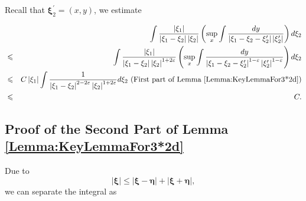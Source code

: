 \documentclass[reqno]{amsart}
\theoremstyle{plain}
\numberwithin{equation}{section}
\begin{document}
Recall that $\mathbf{\xi }_{2}^{\prime }=(x,y)$, we estimate

\begin{eqnarray*}
&&\int \frac{\left\vert \mathbf{\xi }_{1}\right\vert }{\left\vert \mathbf{\xi }_{1}-\mathbf{\xi }_{2}\right\vert \left\vert \mathbf{\xi }_{2}\right\vert }\left( \sup_{x}\int \frac{dy}{\left\vert \mathbf{\xi }_{1}-\mathbf{\xi }_{2}-\mathbf{\xi }_{2}^{\prime }\right\vert \left\vert \mathbf{\xi }_{2}^{\prime }\right\vert }\right) d\mathbf{\xi }_{2} \\
&\leqslant &\int \frac{\left\vert \mathbf{\xi }_{1}\right\vert }{\left\vert 
\mathbf{\xi }_{1}-\mathbf{\xi }_{2}\right\vert \left\vert \mathbf{\xi }_{2}\right\vert ^{1+2\varepsilon }}\left( \sup_{x}\int \frac{dy}{\left\vert 
\mathbf{\xi }_{1}-\mathbf{\xi }_{2}-\mathbf{\xi }_{2}^{\prime }\right\vert
^{1-\varepsilon }\left\vert \mathbf{\xi }_{2}^{\prime }\right\vert
^{1-\varepsilon }}\right) d\mathbf{\xi }_{2} \\
&\leqslant &C\left\vert \mathbf{\xi }_{1}\right\vert \int \frac{1}{\left\vert \mathbf{\xi }_{1}-\mathbf{\xi }_{2}\right\vert ^{2-2\varepsilon
}\left\vert \mathbf{\xi }_{2}\right\vert ^{1+2\varepsilon }}d\mathbf{\xi }_{2}\text{ (First part of Lemma \ref{Lemma:KeyLemmaFor3*2d})} \\
&\leqslant &C.
\end{eqnarray*}

\subsection{Proof of the Second Part of Lemma \protect\ref{Lemma:KeyLemmaFor3*2d}}

Due to\begin{equation*}
\left\vert \mathbf{\xi }\right\vert \leqslant \left\vert \mathbf{\xi }-\mathbf{\eta }\right\vert +\left\vert \mathbf{\xi }+\mathbf{\eta }\right\vert ,
\end{equation*}we can separate the integral as
\end{document}
